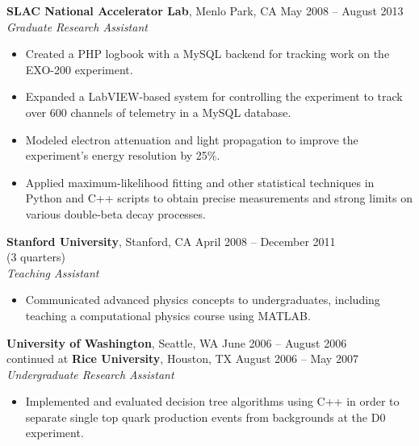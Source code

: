 \documentclass[margin,line]{resume}
\begin{document}
\begin{resume}
    \textbf{SLAC National Accelerator Lab}, Menlo Park, CA \hfill May 2008 -- August 2013\vspace{1mm}\\\vspace{1mm}%
    \textsl{Graduate Research Assistant}
    \begin{itemize}
    \item Created a PHP logbook with a MySQL backend for tracking work on the EXO-200 experiment.
    \item Expanded a LabVIEW-based system for controlling the experiment to track over 600 channels of telemetry in a MySQL database.
    \item Modeled electron attenuation and light propagation to improve the experiment's energy resolution by 25\%.
    \item Applied maximum-likelihood fitting and other statistical techniques in Python and C++ scripts to obtain precise measurements and strong limits on various double-beta decay processes.
    \end{itemize}
    
    \textbf{Stanford University}, Stanford, CA \hfill April 2008 -- December 2011 \vspace{0mm}\\
    \hfill (3 quarters)\vspace{1mm}\\\vspace{1mm}%
    \textsl{Teaching Assistant}
    \begin{itemize}
    \item Communicated advanced physics concepts to undergraduates, including teaching a computational physics course using MATLAB.
    \end{itemize}
    
    \textbf{University of Washington}, Seattle, WA \hfill June 2006 -- August 2006 \vspace{0mm}\\
    continued at \textbf{Rice University}, Houston, TX \hfill August 2006 -- May 2007 \vspace{1mm}\\\vspace{1mm}%
    \textsl{Undergraduate Research Assistant}
    \begin{itemize}
    \item Implemented and evaluated decision tree algorithms using C++ in order to separate single top quark production events from backgrounds at the D0 experiment.
    \end{itemize}
 

\end{resume}
\end{document}
